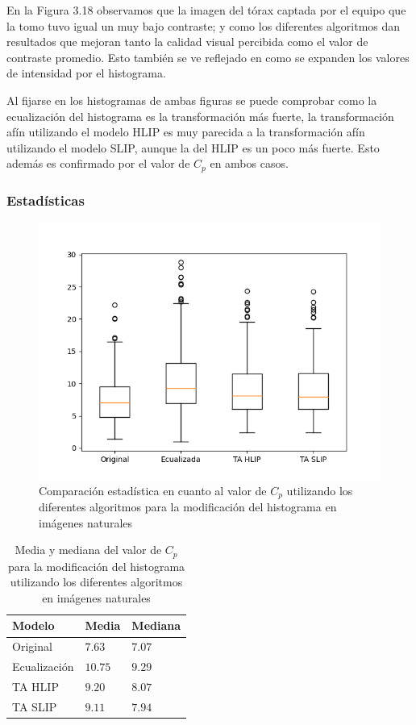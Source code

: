 En la Figura 3.18 observamos que la imagen del t\'orax captada por el equipo que la tomo tuvo igual un muy bajo contraste; y como los diferentes algoritmos dan resultados que mejoran tanto la calidad visual percibida como el valor de contraste promedio. Esto tambi\'en se ve reflejado en como se expanden los valores de intensidad por el histograma.

Al fijarse en los histogramas de ambas figuras se puede comprobar como la ecualizaci\'on del histograma es la transformaci\'on m\'as fuerte, la transformaci\'on af\'in utilizando el modelo HLIP  es muy parecida a la transformaci\'on af\'in utilizando el modelo SLIP, aunque la del HLIP es un poco m\'as fuerte. Esto adem\'as es confirmado por el valor de $C_p$ en ambos casos.

\subsubsection{Estad\'isticas}

\begin{figure}
	\begin{center}
		\includegraphics[width=10.0 cm]{images/graphics/natural/affine_transform/eq_all.png}
		\caption{Comparaci\'on estad\'istica en cuanto al valor de $C_p$ utilizando los diferentes algoritmos para la modificaci\'on del histograma en im\'agenes naturales}
	\end{center}
\end{figure}

\begin{table}
	\begin{center}
		\begin{tabular}{|l|l|l|}
			\hline 
			Modelo & Media & Mediana\\
			\hline
			Original & $7.63$ & $7.07$\\
			\hline
			Ecualizaci\'on & $10.75$ & $9.29$\\
			\hline
			TA HLIP & $9.20$ & $8.07$\\
			\hline
			TA SLIP & $9.11$ & $7.94$\\
			\hline
		\end{tabular}
		\caption{Media y mediana del valor de $C_p$ para la modificaci\'on del histograma utilizando los diferentes algoritmos en im\'agenes naturales}
	\end{center}
\end{table}

